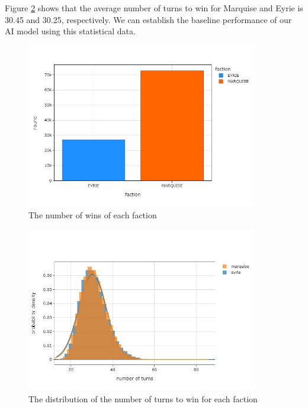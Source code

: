 Figure \ref{fig:introductory-winner-turn-dist} shows that the average number of turns to win for Marquise and Eyrie is 30.45 and 30.25, respectively. We can establish the baseline performance of our AI model using this statistical data.

\begin{figure}[h!]
    \begin{center}
      \includegraphics[width=0.9\textwidth]{./images/fig-introductory-win.jpeg}
    \end{center}
    \caption{The number of wins of each faction}
    \label{fig:introductory-win}
\end{figure}

\begin{figure}[h!]
    \begin{center}
      \includegraphics[width=0.9\textwidth]{./images/fig-introductory-winner-turn-dist.jpeg}
    \end{center}
    \caption{The distribution of the number of turns to win for each faction}
    \label{fig:introductory-winner-turn-dist}
\end{figure}

